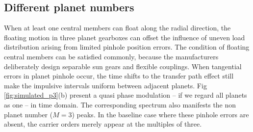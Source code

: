 \documentclass[a4paper,fleqn]{cas-sc}%
\begin{document}
\subsection{Different planet numbers}
\par When at least one central members can float along the radial direction, the floating motion in three planet gearboxes can offset the influence of uneven load distribution arising from limited pinhole position errors. The condition of floating central members can be satisfied commonly, because the manufacturers deliberately design separable sun gears  and flexible couplings.  When tangential errors in planet pinhole occur, the time shifts to the transfer path effect still make the impulsive intervals uniform between adjacent planets. Fig \ref{fig:simulated_p3}(b) present a quasi phase modulation -- if we regard all planets as one -- in time domain.  The corresponding spectrum also manifests the non planet number ($M=3$) peaks. In the baseline case where these pinhole errors are absent, the carrier orders merely appear at the multiples of three.
\end{document}
